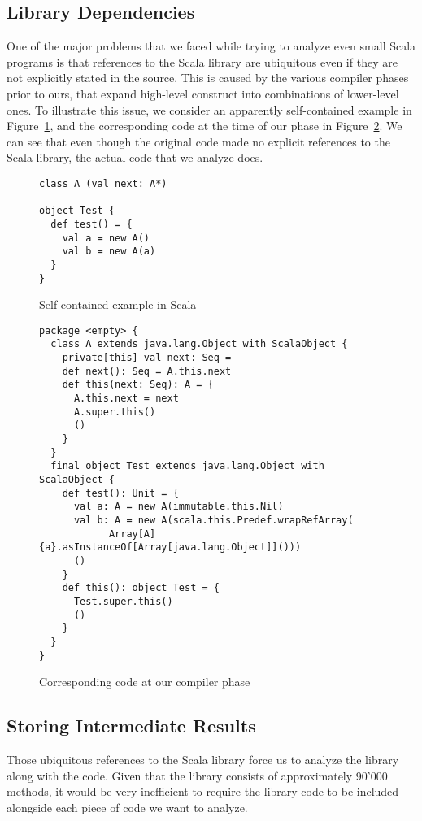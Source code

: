 \subsection{Library Dependencies}
One of the major problems that we faced while trying to analyze even small
Scala programs is that references to the Scala library are ubiquitous even if
they are not explicitly stated in the source. This is caused by the various
compiler phases prior to ours, that expand high-level construct into
combinations of lower-level ones. To illustrate this issue, we consider an
apparently self-contained example in Figure~\ref{fig:imp:class}, and the
corresponding code at the time of our phase in Figure~\ref{fig:imp:classlater}.
We can see that even though the original code made no explicit references to
the Scala library, the actual code that we analyze does.
\begin{figure}[h]
    \centering
\begin{lstlisting}
class A (val next: A*)

object Test {
  def test() = {
    val a = new A()
    val b = new A(a)
  }
}
\end{lstlisting}
    \caption{Self-contained example in Scala}
    \label{fig:imp:class}
\end{figure}

\begin{figure}[h]
    \centering
\begin{lstlisting}
package <empty> {
  class A extends java.lang.Object with ScalaObject {
    private[this] val next: Seq = _
    def next(): Seq = A.this.next
    def this(next: Seq): A = {
      A.this.next = next
      A.super.this()
      ()
    }
  }
  final object Test extends java.lang.Object with ScalaObject {
    def test(): Unit = {
      val a: A = new A(immutable.this.Nil)
      val b: A = new A(scala.this.Predef.wrapRefArray(
            Array[A]{a}.asInstanceOf[Array[java.lang.Object]]()))
      ()
    }
    def this(): object Test = {
      Test.super.this()
      ()
    }
  }
}
\end{lstlisting}
    \caption{Corresponding code at our compiler phase}
    \label{fig:imp:classlater}
\end{figure}

\subsection{Storing Intermediate Results}
Those ubiquitous references to the Scala library force us to analyze the
library along with the code. Given that the library consists of approximately
90'000 methods, it would be very inefficient to require the library code to be
included alongside each piece of code we want to analyze.

